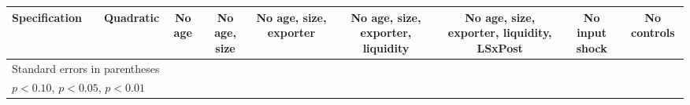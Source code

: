 \begin{table}[htbp]
\begin{tabular}{l*{9}{c}}
Specification&                     &   Quadratic         &      No age         &No age, size         &No age, size, exporter         &No age, size, exporter, liquidity         &No age, size, exporter, liquidity, LSxPost         &No input shock         & No controls         \\
\hline\hline
\multicolumn{10}{l}{\footnotesize Standard errors in parentheses}\\
\multicolumn{10}{l}{\footnotesize \sym{*} \(p<0.10\), \sym{**} \(p<0.05\), \sym{***} \(p<0.01\)}\\
\end{tabular}
\end{table}
